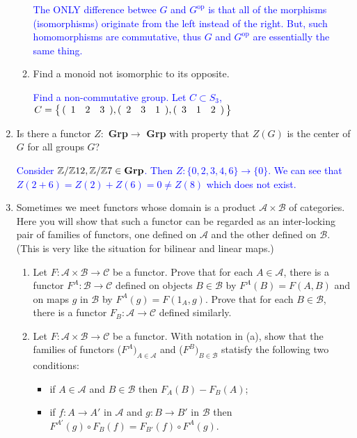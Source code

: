 \documentclass[12pt,a4paper]{report}
\newcommand{\BLUE}[1]{\textcolor{blue}{#1}}
\newcommand{\OP}{{\operatorname{op}}}
\newcommand{\CAT}[1]{\mathscr{#1}}
\newcommand{\CATSET}[1]{\operatorname{\textbf{#1}}}
\begin{document}
\begin{enumerate}[label=1.2.\arabic*]
\begin{enumerate}
	\BLUE{The ONLY difference betwee $G$ and $G^\OP$ is that all of the morphisms (isomorphisms) originate from the left instead of the right.  But, such homomorphisms are commutative, thus $G$ and $G^\OP$ are essentially the same thing.
	}
	
	\item Find a monoid not isomorphic to its opposite.

	\BLUE{Find a non-commutative group.  Let $C \subset S_3$, $C=\left \{\, (\begin{array}{cccccccccc} 1 & 2 & 3 \end{array}), (\begin{array}{cccccccccc} 2 & 3 & 1 \end{array}), (\begin{array}{cccccccccc} 3 & 1 & 2 \end{array}) \,\right \}$
	}
	
\end{enumerate}

\item Is there a functor $Z:$ \textbf{Grp}$ \to $ \textbf{Grp} with property that $Z(G)$ is the center of $G$ for all groups $G$?

\BLUE{Consider $\Z/\Z12, \Z/\Z7 \in \CATSET{Grp}$.  Then $Z: \{0,2, 3, 4, 6\} \to \{0\}$.  We can see that $Z(2+6)=Z(2)+Z(6)=0 \ne Z(8)$ which does not exist.
}

\item Sometimes we meet functors whose domain is a product $\CAT{A}\times \CAT{B}$ of categories.  Here you will show that such a functor can be regarded as an inter-locking pair of families of functors, one defined on $\CAT{A}$ and the other defined on $\CAT{B}$.  (This is very like the situation for bilinear and linear maps.)

\begin{enumerate}
	\item Let $F:\CAT{A}\times\CAT{B}\to\CAT{C}$ be a functor. Prove that for each $A \in \CAT{A}$, there is a functor $F^A:\CAT{B}\to\CAT{C}$ defined on objects $B \in \CAT{B}$ by $F^A(B)=F(A,B)$ and on maps $g$ in $\CAT{B}$ by $F^A(g)=F(1_A,g)$.  Prove that for each $B \in \CAT{B}$, there is a functor $F_B:\CAT{A}\to\CAT{C}$ defined similarly.
	
	\item Let $F:\CAT{A}\times \CAT{B}\to\CAT{C}$ be a functor.  With notation in (a), show that the families of functors ($F^A)_{A \in \CAT{A}}$ and ($F^B)_{B \in \CAT{B}}$ statisfy the following two conditions:
	\begin{itemize}
		\item if $A\in \CAT{A}$ and $B\in \CAT{B}$ then $F_A(B)-F_B(A)$;
		\item if $f:A \to A'$ in $\CAT{A}$ and $g:B \to B'$ in $\CAT{B}$ then $F^{A'}(g)\circ F_B(f) = F_{B'}(f)\circ F^A(g).$
	\end{itemize}
	

\end{enumerate}
\end{enumerate}
\end{document}
